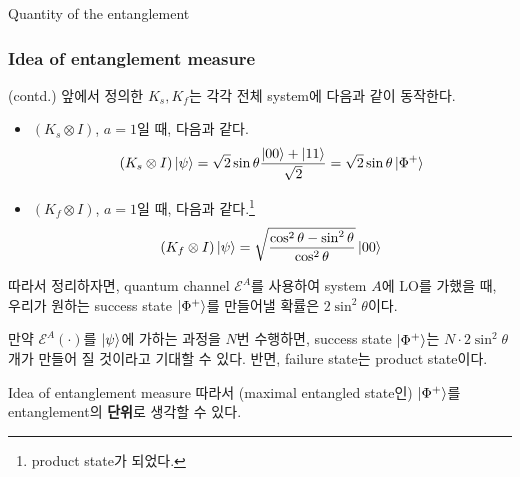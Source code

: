 \documentclass[9pt]{beamer}
\begin{document}
\begin{section}{Quantity of the entanglement}
        \begin{frame}
            \frametitle{Idea of entanglement measure}
            (contd.) 앞에서 정의한 $K_s, K_f$는 각각 전체 system에 다음과 같이 동작한다.
            \begin{itemize}
                \item $(K_s \otimes I)$, $a=1$일 때, 다음과 같다. 
                \begin{equation*}
                    (K_s\otimes I) \ket{\psi} = \sqrt 2 \sin \theta \frac{\ket{00} + \ket{11}}{\sqrt 2} = \sqrt 2 \sin \theta \ket{\Phi^+}
                \end{equation*}
                \item $(K_f \otimes I)$, $a=1$일 때, 다음과 같다.\footnote{product state가 되었다.}
                \begin{equation*}
                    (K_f\otimes I) \ket{\psi} = \sqrt{\frac{\cos^2 \theta - \sin^2 \theta}{\cos^2 \theta}} \ket{00}
                \end{equation*}
            \end{itemize}
            \vspace{0.2cm}
            따라서 정리하자면, quantum channel $\mathcal E^A$를 사용하여 system $A$에 LO를 가했을 때, 우리가 원하는 success state $\ket{\Phi^+}$를 만들어낼 확률은 $\boxed{2 \sin^2\theta}$이다.
            
            \vspace{0.2cm}
            만약 $\mathcal E^A(\cdot)$를 $\ket \psi$에 가하는 과정을 $N$번 수행하면, success state $\ket{\Phi^+}$는 $N \cdot 2\sin^2\theta$개가 만들어 질 것이라고 기대할 수 있다. 반면, failure state는 \alert{product state}이다.
            \begin{alertblock}{Idea of entanglement measure}
                따라서 (maximal entangled state인) $\ket{\Phi^+}$를 {entanglement}의 \textbf{단위}로 생각할 수 있다.
            \end{alertblock}
        \end{frame}


\end{section}
\end{document}
